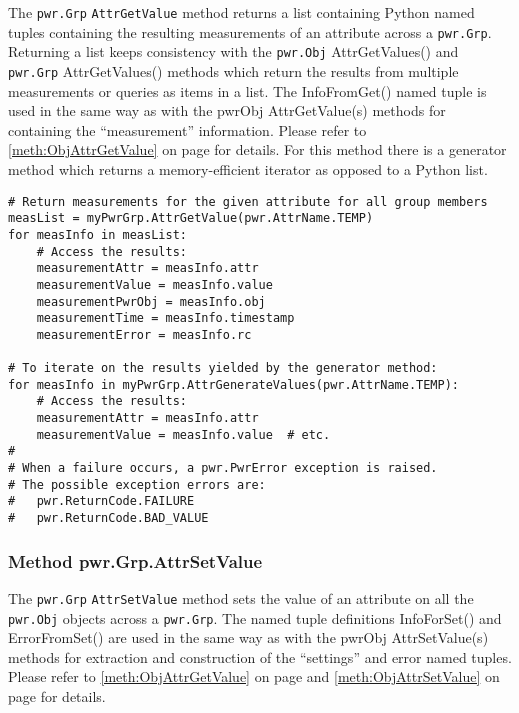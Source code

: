 The \texttt{pwr.Grp} \texttt{AttrGetValue} method returns a list containing Python
named tuples containing the resulting measurements of an attribute across a
\texttt{pwr.Grp}. Returning a list keeps consistency with the
\texttt{pwr.Obj} AttrGetValues() and \texttt{pwr.Grp} AttrGetValues()
methods which return the results from multiple measurements or queries as items
in a list. The InfoFromGet() named tuple is used in the same way
as with the pwrObj AttrGetValue(s) methods for containing
the ``measurement'' information. Please refer to \ref{meth:ObjAttrGetValue} on
page \pageref{meth:ObjAttrGetValue} for details. For this method there is a
generator method which returns a memory-efficient iterator as opposed to a
Python list.

\begin{center}\begin{minipage}{.95\linewidth}\begin{lstlisting}
# Return measurements for the given attribute for all group members
measList = myPwrGrp.AttrGetValue(pwr.AttrName.TEMP)
for measInfo in measList:
    # Access the results:
    measurementAttr = measInfo.attr
    measurementValue = measInfo.value
    measurementPwrObj = measInfo.obj
    measurementTime = measInfo.timestamp
    measurementError = measInfo.rc

# To iterate on the results yielded by the generator method:
for measInfo in myPwrGrp.AttrGenerateValues(pwr.AttrName.TEMP):
    # Access the results:
    measurementAttr = measInfo.attr
    measurementValue = measInfo.value  # etc.
#
# When a failure occurs, a pwr.PwrError exception is raised.
# The possible exception errors are:
#   pwr.ReturnCode.FAILURE
#   pwr.ReturnCode.BAD_VALUE
\end{lstlisting}\end{minipage}\end{center}

\subsubsection{Method pwr.Grp.AttrSetValue}
\label{meth:GrpAttrSetValue}

The \texttt{pwr.Grp} \texttt{AttrSetValue} method sets the value of an attribute on all the
\texttt{pwr.Obj} objects across a \texttt{pwr.Grp}.  The named tuple definitions
InfoForSet() and ErrorFromSet() are used in the same way as with the pwrObj
AttrSetValue(s) methods for extraction and construction of the ``settings''
and error named tuples. Please refer to \ref{meth:ObjAttrGetValue} on page
\pageref{meth:ObjAttrGetValue} and \ref{meth:ObjAttrSetValue} on page
\pageref{meth:ObjAttrSetValue} for details.

